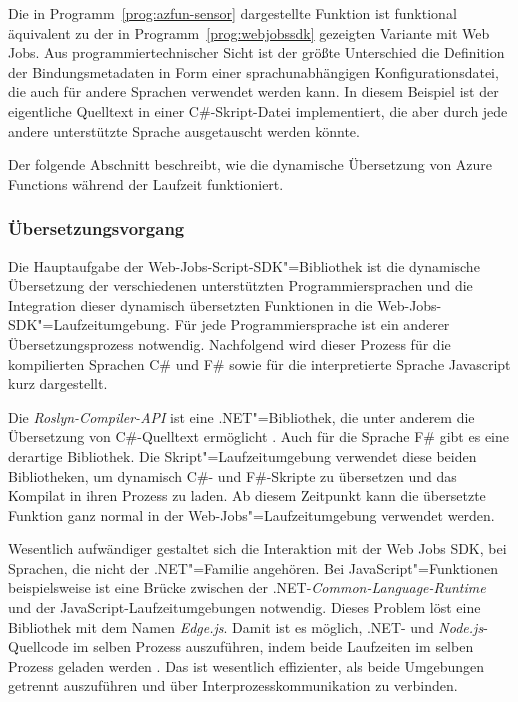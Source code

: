 Die in Programm~\ref{prog:azfun-sensor} dargestellte Funktion ist funktional äquivalent zu der in Programm~\ref{prog:webjobssdk} gezeigten Variante mit Web Jobs. Aus programmiertechnischer Sicht ist der größte Unterschied die Definition der Bindungsmetadaten in Form einer sprachunabhängigen Konfigurationsdatei, die auch für andere Sprachen verwendet werden kann. In diesem Beispiel ist der eigentliche Quelltext in einer C\#-Skript-Datei implementiert, die aber durch jede andere unterstützte Sprache ausgetauscht werden könnte.

Der folgende Abschnitt beschreibt, wie die dynamische Übersetzung von Azure Functions während der Laufzeit funktioniert.

\subsubsection{Übersetzungsvorgang}

Die Hauptaufgabe der Web-Jobs-Script-SDK"=Bibliothek ist die dynamische Übersetzung der verschiedenen unterstützten Programmiersprachen und die Integration dieser dynamisch übersetzten Funktionen in die Web-Jobs-SDK"=Laufzeitumgebung. Für jede Programmiersprache ist ein anderer Übersetzungsprozess notwendig. Nachfolgend wird dieser Prozess für die kompilierten Sprachen C\# und F\# sowie für die interpretierte Sprache Javascript kurz dargestellt.

Die \textit{Roslyn-Compiler-API} ist eine .NET"=Bibliothek, die unter anderem die Übersetzung von C\#-Quelltext ermöglicht \cite[5]{Roslyn}. Auch für die Sprache F\# gibt es eine derartige Bibliothek. Die Skript"=Laufzeitumgebung verwendet diese beiden Bibliotheken, um dynamisch C\#- und F\#-Skripte zu übersetzen und das Kompilat in ihren Prozess zu laden. Ab diesem Zeitpunkt kann die übersetzte Funktion ganz normal in der Web-Jobs"=Laufzeitumgebung verwendet werden.

Wesentlich aufwändiger gestaltet sich die Interaktion mit der Web Jobs SDK, bei Sprachen, die nicht der .NET"=Familie angehören. Bei JavaScript"=Funktionen beispielsweise ist eine Brücke zwischen der .NET-\textit{Common-Language-Runtime} und der JavaScript-Laufzeitumgebungen notwendig. Dieses Problem löst eine Bibliothek mit dem Namen \textit{Edge.js}. Damit ist es möglich, .NET- und \textit{Node.js}-Quellcode im selben Prozess auszuführen, indem beide Laufzeiten im selben Prozess geladen werden \cite{EdgeJs}. Das ist wesentlich effizienter, als beide Umgebungen getrennt auszuführen und über Interprozesskommunikation zu verbinden.


